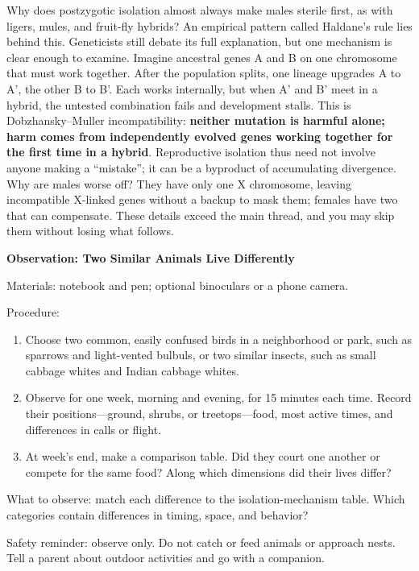 \begin{tiaozhan}
Why does postzygotic isolation almost always make males sterile first, as with ligers, mules, and fruit-fly hybrids? An empirical pattern called Haldane's rule lies behind this. Geneticists still debate its full explanation, but one mechanism is clear enough to examine. Imagine ancestral genes A and B on one chromosome that must work together. After the population splits, one lineage upgrades A to A', the other B to B'. Each works internally, but when A' and B' meet in a hybrid, the untested combination fails and development stalls. This is Dobzhansky--Muller incompatibility: \textbf{neither mutation is harmful alone; harm comes from independently evolved genes working together for the first time in a hybrid}. Reproductive isolation thus need not involve anyone making a ``mistake''; it can be a byproduct of accumulating divergence. Why are males worse off? They have only one X chromosome, leaving incompatible X-linked genes without a backup to mask them; females have two that can compensate. These details exceed the main thread, and you may skip them without losing what follows.
\end{tiaozhan}

\begin{shiyan}
\textbf{Observation: Two Similar Animals Live Differently}

Materials: notebook and pen; optional binoculars or a phone camera.

Procedure:
\begin{enumerate}[itemsep=1pt]
\item Choose two common, easily confused birds in a neighborhood or park, such as sparrows and light-vented bulbuls, or two similar insects, such as small cabbage whites and Indian cabbage whites.
\item Observe for one week, morning and evening, for 15 minutes each time. Record their positions---ground, shrubs, or treetops---food, most active times, and differences in calls or flight.
\item At week's end, make a comparison table. Did they court one another or compete for the same food? Along which dimensions did their lives differ?
\end{enumerate}

What to observe: match each difference to the isolation-mechanism table. Which categories contain differences in timing, space, and behavior?

Safety reminder: observe only. Do not catch or feed animals or approach nests. Tell a parent about outdoor activities and go with a companion.
\end{shiyan}

